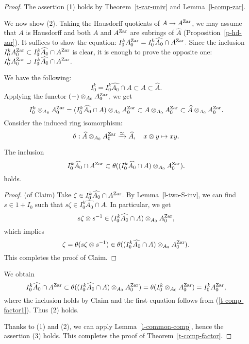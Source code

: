 \begin{proof}
The assertion (1) holds by Theorem~\ref{t-zar-univ} 
and Lemma~\ref{l-comp-zar}. 

We now show (2). 
Taking the Hausdorff quotients of $A \to A^{{\operatorname{Zar}}}$, 
we may assume that $A$ is Hausdorff and 
both $A$ and $A^{{\operatorname{Zar}}}$ are subrings of $\widehat{A}$ (Proposition~\ref{p-hd-zar}). 
It suffices to show the equation: 
$I_0^kA_0^{{\operatorname{Zar}}}=I_0^k \widehat{A_0} \cap A^{{\operatorname{Zar}}}.$ 
Since the inclusion $I_0^kA_0^{{\operatorname{Zar}}} \subset I_0^k \widehat{A_0} \cap A^{{\operatorname{Zar}}}$ is clear, 
it is enough to prove the opposite one: 
$I_0^kA_0^{{\operatorname{Zar}}} \supset I_0^k \widehat{A_0} \cap A^{{\operatorname{Zar}}}$. 

We have the following: 
$$I_0^k = I_0^k \widehat{A_0} \cap A \subset A \subset \widehat{A}.$$ 
Applying the functor $(-) \otimes_{A_0} A_0^{{\operatorname{Zar}}}$, we get  
{\small 
\begin{equation}\label{t-comp-factor1}
I_0^k \otimes_{A_0} A_0^{{\operatorname{Zar}}} = 
(I_0^k\widehat{A_0} \cap A) \otimes_{A_0} A_0^{{\operatorname{Zar}}} \subset A \otimes_{A_0} A_0^{{\operatorname{Zar}}} \subset \widehat{A} \otimes_{A_0} A_0^{{\operatorname{Zar}}}.
\end{equation}
}
Consider the induced ring isomorphism: 
$$\theta:\widehat{A} \otimes_{A_0} A_0^{{\operatorname{Zar}}} \xrightarrow{\simeq} \widehat{A}, \quad x \otimes y \mapsto xy.$$

\begin{claim}
The inclusion 
$$I_0^k\widehat{A_0} \cap A^{{\operatorname{Zar}}} \subset 
\theta((I_0^k\widehat{A_0} \cap A) \otimes_{A_0} A_0^{{\operatorname{Zar}}}).$$
holds. 
\end{claim}

\begin{proof}(of Claim) 
Take $\zeta \in I_0^k\widehat{A_0} \cap A^{{\operatorname{Zar}}}$. 
By Lemma~\ref{l-two-S-inv}, 
we can find $s \in 1+I_0$ such that $s\zeta \in I_0^k\widehat{A_0} \cap A$. 
In particular, we get 
$$s\zeta \otimes s^{-1} \in (I_0^k\widehat{A_0} \cap A) \otimes_{A_0} A_0^{{\operatorname{Zar}}},$$
which implies 
$$\zeta= \theta(s\zeta \otimes s^{-1}) \in \theta((I_0^k\widehat{A_0} \cap A) \otimes_{A_0} A_0^{{\operatorname{Zar}}}).$$
This completes the proof of Claim. 
\end{proof}

We obtain 
$$I_0^k\widehat{A_0} \cap A^{{\operatorname{Zar}}} \subset 
\theta((I_0^k\widehat{A_0} \cap A) \otimes_{A_0} A_0^{{\operatorname{Zar}}})
=\theta(I_0^k \otimes_{A_0} A_0^{{\operatorname{Zar}}})=I^k_0A_0^{{\operatorname{Zar}}},$$
where the inclusion holds by Claim and 
the first equation follows from (\ref{t-comp-factor1}). 
Thus (2) holds. 






Thanks to (1) and (2), we can apply Lemma~\ref{l-common-comp}, 
hence the assertion (3) holds. 
This completes the proof of Theorem~\ref{t-comp-factor}. 
\end{proof}

